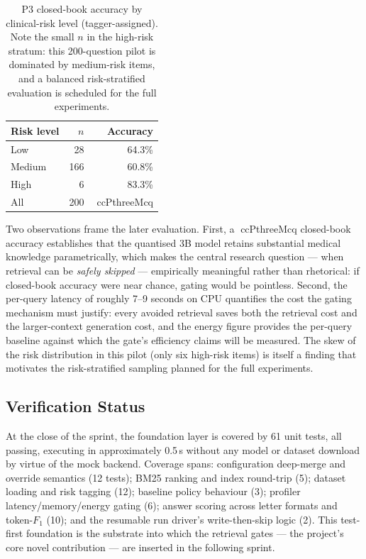 \begin{table}[ht]
  \centering
  \caption{P3 closed-book accuracy by clinical-risk level (tagger-assigned).
           Note the small $n$ in the high-risk stratum: this 200-question
           pilot is dominated by medium-risk items, and a balanced
           risk-stratified evaluation is scheduled for the full experiments.}
  \label{tab:p3-byrisk}
  \begin{tabular}{lrr}
    \toprule
    \textbf{Risk level} & \textbf{$n$} & \textbf{Accuracy} \\
    \midrule
    Low    & 28  & 64.3\% \\
    Medium & 166 & 60.8\% \\
    High   & 6   & 83.3\% \\
    \midrule
    All    & 200 & ccPthreeMcq \\
    \bottomrule
  \end{tabular}
\end{table}

Two observations frame the later evaluation. First, a ccPthreeMcq{} closed-book
accuracy establishes that the quantised 3B model retains substantial medical
knowledge parametrically, which makes the central research question --- when
retrieval can be \emph{safely skipped} --- empirically meaningful rather than
rhetorical: if closed-book accuracy were near chance, gating would be
pointless. Second, the per-query latency of roughly 7--9 seconds on CPU
quantifies the cost the gating mechanism must justify: every avoided retrieval
saves both the retrieval cost and the larger-context generation cost, and the
energy figure provides the per-query baseline against which the gate's
efficiency claims will be measured. The skew of the risk distribution in this
pilot (only six high-risk items) is itself a finding that motivates the
risk-stratified sampling planned for the full experiments.

\subsection{Verification Status}
\label{sec:impl-verification}

At the close of the sprint, the foundation layer is covered by 61 unit tests,
all passing, executing in approximately 0.5\,s without any model or dataset
download by virtue of the mock backend. Coverage spans: configuration
deep-merge and override semantics (12 tests); BM25 ranking and index
round-trip (5); dataset loading and risk tagging (12); baseline policy
behaviour (3); profiler latency/memory/energy gating (6); answer scoring
across letter formats and token-$F_1$ (10); and the resumable run driver's
write-then-skip logic (2). This test-first foundation is the substrate into
which the retrieval gates --- the project's core novel contribution --- are
inserted in the following sprint.
